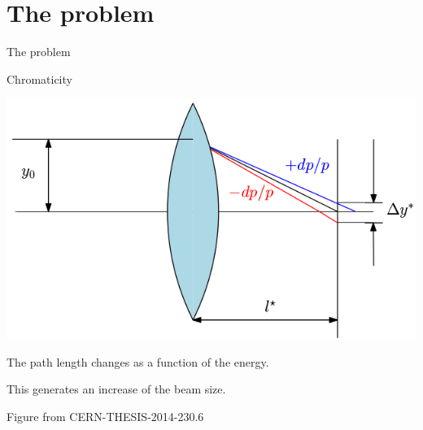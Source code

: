 \documentclass{beamer}
\begin{document}
\section{The problem}
\begin{frame}
 \color{blue}\Large The problem
\end{frame}
\begin{frame}{Chromaticity}
\begin{center}
 \includegraphics[scale=0.60,angle=0]{chrom.png}
\end{center}
The path length changes as a function of the energy.\par
This generates an increase of the beam size.\par
{\tiny Figure from CERN-THESIS-2014-230.6}
\end{frame}
\end{document}
